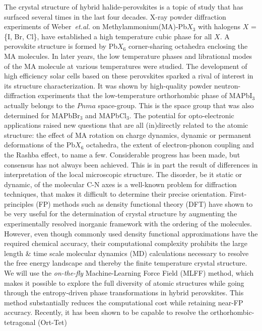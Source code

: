 \documentclass[journal=jpccck,manuscript=article,layout=twocolumn]{achemso}
\begin{document}
The crystal structure of hybrid halide-perovskites is a topic of study that has surfaced several times in the last four decades. X-ray powder diffraction experiments of Weber~\textit{et.al.} on Methylammonium(MA)-Pb$X_3$ with halogens $X$ = \{I, Br, Cl\}, have established a high temperature cubic phase for all $X$\cite{Weber:zfn78}. A perovskite structure is formed by Pb$X_6$ corner-sharing octahedra enclosing the MA molecules. In later years, the low temperature phases and librational modes of the MA molecule at various temperatures were studied\cite{Wasylishen:ssc85,Poglitsch:jcp87,Onoda-Yamamuro:jpcs90,Kawamura:jpsj02,Mashiyama:jkps07}. The development of high efficiency solar cells based on these perovskites sparked a rival of interest in its structure characterization\cite{Stoumpos:ic13,Baikie:jmca:13,Weller:chc15,Govinda:jpcl16}. It was shown by high-quality powder neutron-diffraction experiments\cite{Weller:chc15} that the low-temperature orthorhombic phase of MAPbI$_3$ actually belongs to the $Pnma$ space-group. This is the space group that was also determined for MAPbBr$_3$\cite{Swainson:jssc03} and MAPbCl$_3$\cite{Chi:jssc05}. The potential for opto-electronic applications raised new questions that are all (in)directly related to the atomic structure: the effect of MA rotation on charge dynamics\cite{Gelvez-Rueda:jpcc16,Fabini:jacs17}, dynamic or permanent deformations of the Pb$X_6$ octahedra\cite{Beecher:acsel16,Page:acie16,Bernasconi:acsenl17,Bernasconi:jpcc18}, the extent of electron-phonon coupling\cite{Wright:natc16,Sender:math16,Neukirch:nanol16} and the Rashba effect\cite{Stroppa:natc14,Azarhoosh:aplm16,Leppert:jpcl16,Etienne:jpcl16,Hutter:natm17,Frohna:natc18}, to name a few. Considerable progress has been made, but consensus has not always been achieved. This is in part the result of differences in interpretation of the local microscopic structure. The disorder, be it static or dynamic, of the molecular C-N axes is a well-known problem for diffraction techniques, that makes it difficult to determine their precise orientation\cite{Bernasconi:jpcc18,Wiedemann:jpcl21}. First-principles (FP) methods such as density functional theory (DFT) have shown to be very useful for the determination of crystal structure by augmenting the experimentally resolved inorganic framework with the ordering of the molecules\cite{Filippetti:jpcc14,Quarti:com14,Mattoni:jpcc15,Brivio:prb15,Bakulin:jpcl15,Lahnsteiner:prb16,Carignano:jpcc2017,Lahnsteiner:prm18,Maheshwari:jpcc19}. However, even though commonly used density functional approximations have the required chemical accuracy\cite{Bokdam:prl17}, their computational complexity prohibits the large length \&{} time scale molecular dynamics (MD) calculations necessary to resolve the free energy landscape and thereby the finite temperature crystal structure\cite{Mattoni:jpcc15}. We will use the \textit{on-the-fly} Machine-Learning Force Field (MLFF) method\cite{Jinnouchi:prl19,Jinnouchi:prb19}, which makes it possible to explore the full diversity of atomic structures while going through the entropy-driven phase transformations in hybrid perovskites. This method substantially reduces the computational cost while retaining near-FP accuracy. Recently, it has been shown to be capable to resolve the orthorhombic-tetragonal (Ort-Tet) 
\end{document}
